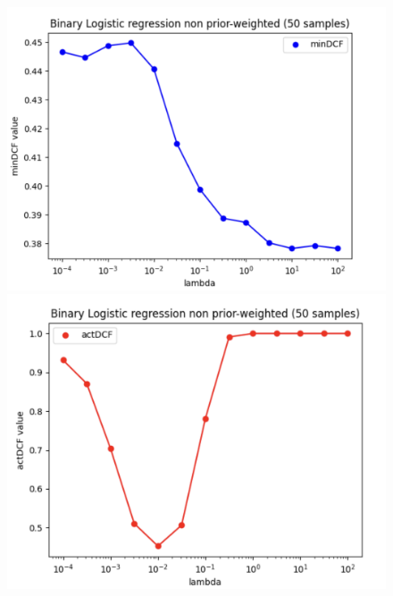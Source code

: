 \documentclass{article}
\begin{document}
    \begin{figure}[H]
        \centering
        \begin{minipage}{.3\textwidth}
            \centering
            \includegraphics[width=\linewidth]{./img/LLR_noW501.png}
        \end{minipage}%
        \begin{minipage}{.3\textwidth}
            \centering
            \includegraphics[width=\linewidth]{./img/LLR_noW502.png}
        \end{minipage}
        \begin{minipage}{.3\textwidth}

\end{minipage}
\end{figure}
\end{document}
